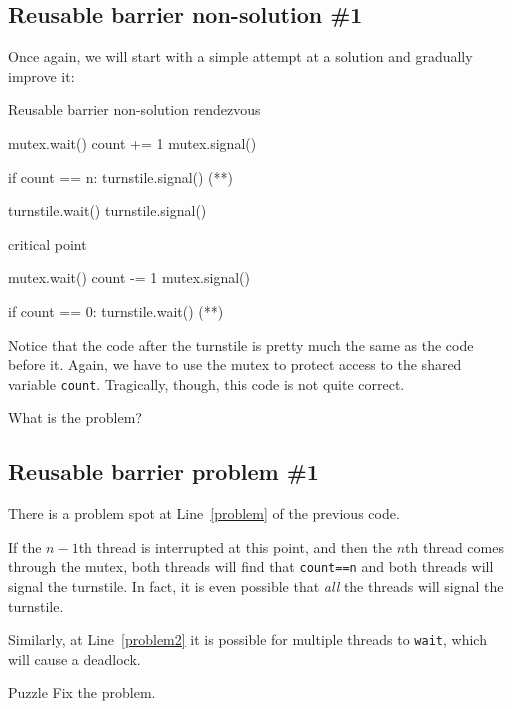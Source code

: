 \subsection*{Reusable barrier non-solution \#1}

Once again, we will start with a simple attempt at a solution
and gradually improve it:

\begin{lstbox}{Reusable barrier non-solution}
rendezvous

mutex.wait()
    count += 1
mutex.signal()

if count == n: turnstile.signal()       (*\label{problem}*)

turnstile.wait()
turnstile.signal()

critical point

mutex.wait()
    count -= 1
mutex.signal()

if count == 0: turnstile.wait()         (*\label{problem2}*)
\end{lstbox}

Notice that the code after the turnstile is pretty much the same as
the code before it.  Again, we have to use the mutex to protect access
to the shared variable {\tt count}.
Tragically, though, this code is not quite correct.

\vspace{1em}
What is the problem?


\subsection*{Reusable barrier problem \#1}

There is a problem spot at Line~\ref{problem} of the previous code.

If the $n-1$th thread is interrupted at this point,
and then the $n$th thread comes through the mutex,
both threads will find that {\tt count==n} and both
threads will signal the turnstile.  In fact, it is even
possible that {\em all} the threads will signal the turnstile.

Similarly, at Line~\ref{problem2} it is possible for multiple
threads to {\tt wait}, which will cause a deadlock.

\begin{puzzlebox}{Puzzle}
Fix the problem.
\end{puzzlebox}

